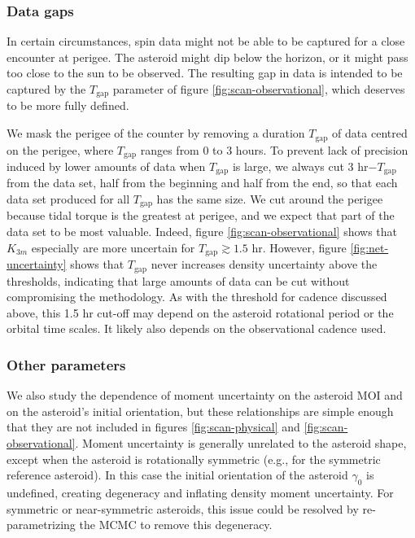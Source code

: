 \documentclass[fleqn,usenatbib]{mnras}
\begin{document}
\subsubsection{Data gaps}
\label{sec:scan-gap}
In certain circumstances, spin data might not be able to be captured for a close encounter at perigee. The asteroid might dip below the horizon, or it might pass too close to the sun to be observed. The resulting gap in data is intended to be captured by the $T_\text{gap}$ parameter of figure \ref{fig:scan-observational}, which deserves to be more fully defined.

We mask the perigee of the counter by removing a duration $T_\text{gap}$ of data centred on the perigee, where $T_\text{gap}$ ranges from 0 to 3 hours. To prevent lack of precision induced by lower amounts of data when $T_\text{gap}$ is large, we always cut 3 hr$-T_\text{gap}$ from the data set, half from the beginning and half from the end, so that each data set produced for all $T_\text{gap}$ has the same size. We cut around the perigee because tidal torque is the greatest at perigee, and we expect that part of the data set to be most valuable. Indeed, figure \ref{fig:scan-observational} shows that $K_{3m}$ especially are more uncertain for $T_\text{gap} \gtrsim 1.5$ hr. However, figure \ref{fig:net-uncertainty} shows that $T_\text{gap}$ never increases density uncertainty above the thresholds, indicating that large amounts of data can be cut without compromising the methodology. As with the threshold for cadence discussed above, this 1.5 hr cut-off may depend on the asteroid rotational period or the orbital time scales. It likely also depends on the observational cadence used.

\subsubsection{Other parameters}

We also study the dependence of moment uncertainty on the asteroid MOI and on the asteroid's initial orientation, but these relationships are simple enough that they are not included in figures \ref{fig:scan-physical} and \ref{fig:scan-observational}. Moment uncertainty is generally unrelated to the asteroid shape, except when the asteroid is rotationally symmetric (e.g., for the symmetric reference asteroid). In this case the initial orientation of the asteroid $\gamma_0$ is undefined, creating degeneracy and inflating density moment uncertainty. For symmetric or near-symmetric asteroids, this issue could be resolved by re-parametrizing the MCMC to remove this degeneracy.
\end{document}
